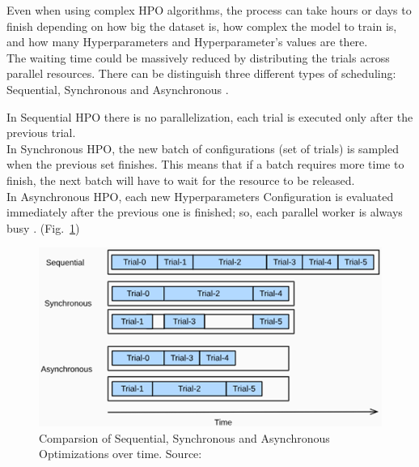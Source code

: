 Even when using complex HPO algorithms, the process can take hours or days to finish depending on how big the dataset is, how complex the model to train is, and how many Hyperparameters and Hyperparameter's values are there.
\\[0.3cm]The waiting time could be massively reduced by distributing the trials across parallel resources. There can be distinguish three different types of scheduling: Sequential, Synchronous and Asynchronous \cite{Tesi-1.6}.

In Sequential HPO there is no parallelization, each trial is executed only after the previous trial.
\\[0.3cm]In Synchronous HPO, the new batch of configurations (set of trials) is sampled when the previous set finishes. This means that if a batch requires more time to finish, the next batch will have to wait for the resource to be released.
\\[0.3cm]In Asynchronous HPO, each new Hyperparameters Configuration is evaluated immediately after the previous one is finished; so, each parallel worker is always busy \cite{Tesi-1.6}.
\newline (Fig.~\ref{fig:figure-2.4.1})
\begin{figure}[t]
	\centering
	\includegraphics[width=12cm]{figures/figure-2.4.1.png}
	\caption[Comparsion of Sequential, Synchronous and Asynchronous Optimizations]{Comparsion of Sequential, Synchronous and Asynchronous Optimizations over time. Source:~\cite{Tesi-1.6}}
	\label{fig:figure-2.4.1}
\end{figure}

